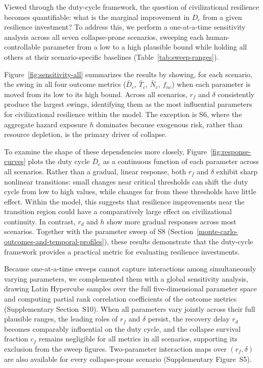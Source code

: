 Viewed through the duty-cycle framework, the question of civilizational resilience becomes quantifiable: what is the marginal improvement in $D_c$ from a given resilience investment? To address this, we perform a one-at-a-time sensitivity analysis across all seven collapse-prone scenarios, sweeping each human-controllable parameter from a low to a high plausible bound while holding all others at their scenario-specific baselines (Table~\ref{tab:sweep-ranges}).

Figure~\ref{fig:sensitivity-all} summarizes the results by showing, for each scenario, the swing in all four outcome metrics ($\bar{D}_c$, $\bar{T}_c$, $\bar{N}_c$, $f_{nc}$) when each parameter is moved from its low to its high bound. Across all scenarios, $r_f$ and $\delta$ consistently produce the largest swings, identifying them as the most influential parameters for civilizational resilience within the model. The exception is S6, where the aggregate hazard exposure $h$ dominates because exogenous risk, rather than resource depletion, is the primary driver of collapse.

To examine the shape of these dependencies more closely, Figure~\ref{fig:response-curves} plots the duty cycle $\bar{D}_c$ as a continuous function of each parameter across all scenarios. Rather than a gradual, linear response, both $r_f$ and $\delta$ exhibit sharp nonlinear transitions: small changes near critical thresholds can shift the duty cycle from low to high values, while changes far from these thresholds have little effect. Within the model, this suggests that resilience improvements near the transition region could have a comparatively large effect on civilizational continuity. In contrast, $r_d$ and $h$ show more gradual responses across most scenarios. Together with the parameter sweep of S8 (Section~\ref{monte-carlo-outcomes-and-temporal-profiles}), these results demonstrate that the duty-cycle framework provides a practical metric for evaluating resilience investments.

Because one-at-a-time sweeps cannot capture interactions among simultaneously varying parameters, we complemented them with a global sensitivity analysis, drawing Latin Hypercube samples over the full five-dimensional parameter space and computing partial rank correlation coefficients of the outcome metrics (Supplementary Section~S10). When all parameters vary jointly across their full plausible ranges, the leading roles of $r_f$ and $\delta$ persist, the recovery delay $r_d$ becomes comparably influential on the duty cycle, and the collapse survival fraction $c_f$ remains negligible for all metrics in all scenarios, supporting its exclusion from the sweep figures. Two-parameter interaction maps over $(r_f, \delta)$ are also available for every collapse-prone scenario (Supplementary Figure~S5).


